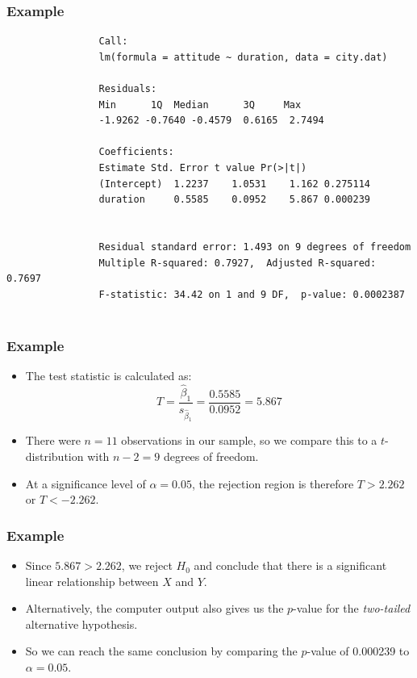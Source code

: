 \documentclass[12pt]{beamer}
\begin{document}
	\begin{frame}[fragile]
		\frametitle{Example}

			\begin{verbatim}
				Call:
				lm(formula = attitude ~ duration, data = city.dat)
				
				Residuals:
				Min      1Q  Median      3Q     Max 
				-1.9262 -0.7640 -0.4579  0.6165  2.7494 
				
				Coefficients:
				Estimate Std. Error t value Pr(>|t|)
				(Intercept)  1.2237    1.0531    1.162 0.275114
				duration     0.5585    0.0952    5.867 0.000239


				Residual standard error: 1.493 on 9 degrees of freedom
				Multiple R-squared: 0.7927,  Adjusted R-squared: 0.7697
				F-statistic: 34.42 on 1 and 9 DF,  p-value: 0.0002387
		
		\end{verbatim}
	\end{frame}
	\begin{frame}
		\frametitle{Example}
		
		\begin{itemize}[label={\color{blue}$\blacktriangleright$}]
			\item The test statistic is calculated as:
			\[
			T = \frac{\hat{\beta}_1}{s_{\hat{\beta}_1}} = \frac{0.5585}{0.0952} = 5.867
			\]
			
			\item There were $n = 11$ observations in our sample, so we compare this to a $t$-distribution with $n - 2 = 9$ degrees of freedom.
			
			\item At a significance level of $\alpha = 0.05$, the rejection region is therefore $T > 2.262$ or $T < -2.262$.
			
		\end{itemize}
		
	\end{frame}
	\begin{frame}
		\frametitle{Example}
		
		\begin{itemize}[label={\color{blue}$\blacktriangleright$}]
			\item Since $5.867 > 2.262$, we reject $H_0$ and conclude that there is a significant linear relationship between $X$ and $Y$.
			
			\item Alternatively, the computer output also gives us the $p$-value for the \textit{two-tailed} alternative hypothesis.
			
			\item So we can reach the same conclusion by comparing the $p$-value of 0.000239 to $\alpha = 0.05$.
			
		\end{itemize}
		
	\end{frame}
\end{document}
